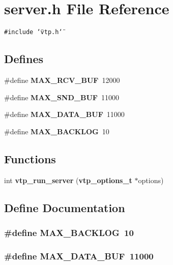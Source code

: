 \section{server.h File Reference}
\label{server_8h}
{\tt \#include \char`\"{}vtp.h\char`\"{}}\par
\subsection*{Defines}
\begin{CompactItemize}
\item 
\#define {\bf MAX\_\-RCV\_\-BUF}\ 12000
\item 
\#define {\bf MAX\_\-SND\_\-BUF}\ 11000
\item 
\#define {\bf MAX\_\-DATA\_\-BUF}\ 11000
\item 
\#define {\bf MAX\_\-BACKLOG}\ 10
\end{CompactItemize}
\subsection*{Functions}
\begin{CompactItemize}
\item 
int {\bf vtp\_\-run\_\-server} ({\bf vtp\_\-options\_\-t} $\ast$options)
\end{CompactItemize}


\subsection{Define Documentation}
\subsubsection{\setlength{\rightskip}{0pt plus 5cm}\#define MAX\_\-BACKLOG\ 10}\label{server_8h_a3}


\subsubsection{\setlength{\rightskip}{0pt plus 5cm}\#define MAX\_\-DATA\_\-BUF\ 11000}\label{server_8h_a2}


